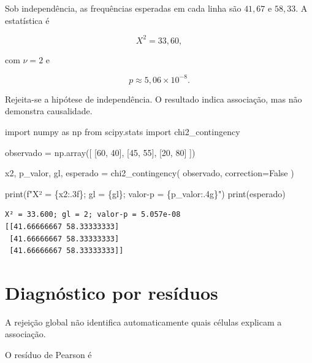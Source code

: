 \documentclass[
  letterpaper,
  DIV=11,
  numbers=noendperiod]{scrreprt}
\newenvironment{Shaded}{\begin{snugshade}}{\end{snugshade}}
\newcommand{\BuiltInTok}[1]{\textcolor[rgb]{0.00,0.23,0.31}{#1}}
\newcommand{\DecValTok}[1]{\textcolor[rgb]{0.68,0.00,0.00}{#1}}
\newcommand{\ImportTok}[1]{\textcolor[rgb]{0.00,0.46,0.62}{#1}}
\newcommand{\NormalTok}[1]{\textcolor[rgb]{0.00,0.23,0.31}{#1}}
\newcommand{\OperatorTok}[1]{\textcolor[rgb]{0.37,0.37,0.37}{#1}}
\newcommand{\SpecialCharTok}[1]{\textcolor[rgb]{0.37,0.37,0.37}{#1}}
\newcommand{\SpecialStringTok}[1]{\textcolor[rgb]{0.13,0.47,0.30}{#1}}
\newcommand{\VariableTok}[1]{\textcolor[rgb]{0.07,0.07,0.07}{#1}}
\begin{document}
Sob independência, as frequências esperadas em cada linha são
\(41{,}67\) e \(58{,}33\). A estatística é

\[X^2=33{,}60,\]

com \(\nu=2\) e

\[p\approx5{,}06\times10^{-8}.\]

Rejeita-se a hipótese de independência. O resultado indica associação,
mas não demonstra causalidade.

\begin{Shaded}
\begin{Highlighting}[]
\ImportTok{import}\NormalTok{ numpy }\ImportTok{as}\NormalTok{ np}
\ImportTok{from}\NormalTok{ scipy.stats }\ImportTok{import}\NormalTok{ chi2\_contingency}

\NormalTok{observado }\OperatorTok{=}\NormalTok{ np.array([}
\NormalTok{    [}\DecValTok{60}\NormalTok{, }\DecValTok{40}\NormalTok{],}
\NormalTok{    [}\DecValTok{45}\NormalTok{, }\DecValTok{55}\NormalTok{],}
\NormalTok{    [}\DecValTok{20}\NormalTok{, }\DecValTok{80}\NormalTok{]}
\NormalTok{])}

\NormalTok{x2, p\_valor, gl, esperado }\OperatorTok{=}\NormalTok{ chi2\_contingency(}
\NormalTok{    observado,}
\NormalTok{    correction}\OperatorTok{=}\VariableTok{False}
\NormalTok{)}

\BuiltInTok{print}\NormalTok{(}\SpecialStringTok{f"X² = }\SpecialCharTok{\{}\NormalTok{x2}\SpecialCharTok{:.3f\}}\SpecialStringTok{; gl = }\SpecialCharTok{\{}\NormalTok{gl}\SpecialCharTok{\}}\SpecialStringTok{; valor{-}p = }\SpecialCharTok{\{}\NormalTok{p\_valor}\SpecialCharTok{:.4g\}}\SpecialStringTok{"}\NormalTok{)}
\BuiltInTok{print}\NormalTok{(esperado)}
\end{Highlighting}
\end{Shaded}

\begin{verbatim}
X² = 33.600; gl = 2; valor-p = 5.057e-08
[[41.66666667 58.33333333]
 [41.66666667 58.33333333]
 [41.66666667 58.33333333]]
\end{verbatim}

\section{Diagnóstico por resíduos}\label{diagnuxf3stico-por-resuxedduos}

A rejeição global não identifica automaticamente quais células explicam
a associação.

O resíduo de Pearson é
\end{document}

